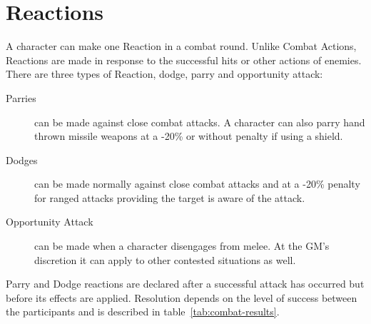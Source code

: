 \section{Reactions}
\label{sec:defensive-reactions}
A character can make one Reaction in a combat round. Unlike Combat Actions, Reactions are made in response to the successful hits or other actions of enemies. There are three types of Reaction, dodge, parry and opportunity attack:
\begin{description}
	\item[Parries] can be made against close combat attacks. A character can also parry hand thrown missile weapons at a -20\% or without penalty if using a shield.%
	\item[Dodges] can be made normally against close combat attacks and at a -20\% penalty for ranged attacks providing the target is aware of the attack.  
	\item[Opportunity Attack] can be made when a character disengages from melee. At the GM's discretion it can apply to other contested situations as well.
\end{description}

\noindent Parry and Dodge reactions are declared after a successful attack has occurred but before its effects are applied. Resolution depends on the level of success between the participants and is described in table~\ref{tab:combat-results}.




